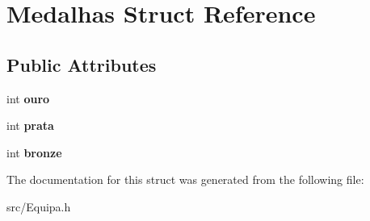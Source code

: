\hypertarget{struct_medalhas}{}\section{Medalhas Struct Reference}
\label{struct_medalhas}
\subsection*{Public Attributes}
\begin{DoxyCompactItemize}
\item 
\hypertarget{struct_medalhas_a257c311f36f3948702395985d809145a}{}int {\bfseries ouro}\label{struct_medalhas_a257c311f36f3948702395985d809145a}

\item 
\hypertarget{struct_medalhas_a63e07882eb073c1bce5d7b48ebee3467}{}int {\bfseries prata}\label{struct_medalhas_a63e07882eb073c1bce5d7b48ebee3467}

\item 
\hypertarget{struct_medalhas_a0128b8c050903b8640ac4ab0dace836e}{}int {\bfseries bronze}\label{struct_medalhas_a0128b8c050903b8640ac4ab0dace836e}

\end{DoxyCompactItemize}


The documentation for this struct was generated from the following file\+:\begin{DoxyCompactItemize}
\item 
src/Equipa.\+h\end{DoxyCompactItemize}
